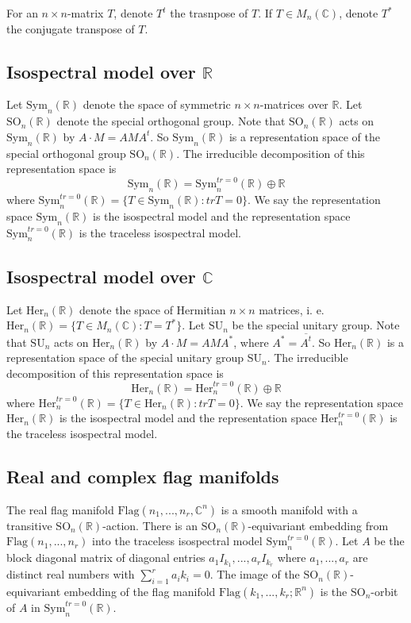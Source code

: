 \documentclass[a4paper]{amsart}
\newcommand{\Flag}{\mathrm{Flag}}
\newcommand{\SO}{{\mathrm{SO}}}\newcommand{\so}{\mathfrak{so}}
\newcommand{\Sym}{{\mathrm{Sym}}}\newcommand{\sgn}{{\mathrm{sgn}}}
\theoremstyle{plain}
\theoremstyle{remark} \newtheorem{remark}[thm]{Remark}
\theoremstyle{remark} \newtheorem{exercise}{Exercise}
\theoremstyle{remark} \newtheorem{example}{Example}
\numberwithin{equation}{section}
\begin{document}
For an $n\times n$-matrix $T$, denote $T^t$ the trasnpose of $T$.
If $T\in M_n(\mathbb{C})$, denote $T^*$ the conjugate transpose of $T$.
\subsection{Isospectral model over $\mathbb{R}$}

Let $\text{Sym}_n(\mathbb{R})$ denote the space of symmetric $n\times n$-matrices over $\mathbb{R}$. Let $\text{SO}_n(\mathbb{R})$ denote the special orthogonal group. Note that $\text{SO}_n(\mathbb{R})$ acts on $\text{Sym}_n(\mathbb{R})$ by 
$A\cdot M=AMA^{t}$. So $\Sym_n(\mathbb{R})$ is a representation space of the special orthogonal group $\text{SO}_n(\mathbb{R})$. The irreducible decomposition of this representation space is
$$\text{Sym}_n(\mathbb{R})=\text{Sym}^{tr=0}_{n}(\mathbb{R})\oplus \mathbb{R}$$
where $\text{Sym}_n^{tr=0}(\mathbb{R})=\{T\in \text{Sym}_n(\mathbb{R}): trT=0\}.$
We say the representation space $\text{Sym}_n(\mathbb{R})$ is the isospectral model and the representation space $\text{Sym}_n^{tr=0}(\mathbb{R})$ is the traceless isospectral model.
\subsection{Isospectral model over $\mathbb{C}$}
Let $\text{Her}_n(\mathbb{R})$ denote the space of Hermitian $n\times n$ matrices, i. e. $\text{Her}_n(\mathbb{R})=\{T\in M_n(\mathbb{C}): T=T^*\}$. Let $\text{SU}_n$ be the special unitary group.
Note that $\text{SU}_n$ acts on $\text{Her}_n(\mathbb{R})$ by 
$A\cdot M=AMA^{*}$, where $A^*=\overline{A^t}$. So $\text{Her}_n(\mathbb{R})$ is a representation space of the special unitary group $\text{SU}_n$. The irreducible decomposition of this representation space is
$$\text{Her}_n(\mathbb{R})=\text{Her}^{tr=0}_{n}(\mathbb{R})\oplus \mathbb{R}$$
where $\text{Her}_n^{tr=0}(\mathbb{R})=\{T\in \text{Her}_n(\mathbb{R}): trT=0\}.$
We say the representation space $\text{Her}_n(\mathbb{R})$ is the isospectral model and the representation space $\text{Her}_n^{tr=0}(\mathbb{R})$ is the traceless isospectral model.


\subsection{Real and complex flag manifolds}
The real flag manifold $\Flag(n_1,...,n_r,\mathbb{C}^n)$ is a smooth manifold 
with a transitive $\text{SO}_n(\mathbb{R})$-action. 
There is an $\SO_n(\mathbb{R})$-equivariant embedding from $\Flag(n_1,...,n_r)$ into the traceless isospectral model $\Sym_n^{tr=0}(\mathbb{R}).$
Let $A$ be the block diagonal matrix of diagonal entries $a_1I_{k_1},...,a_rI_{k_r}$ where $a_1,...,a_r$ are distinct real numbers with $\sum_{i=1}^ra_ik_i=0$. The image of the $\SO_n(\mathbb{R})$-equivariant embedding of the flag manifold $\Flag(k_1,...,k_r;\mathbb{R}^n)$ is the $\SO_n$-orbit of $A$ in $\Sym_n^{tr=0}(\mathbb{R}).$
\end{document}
